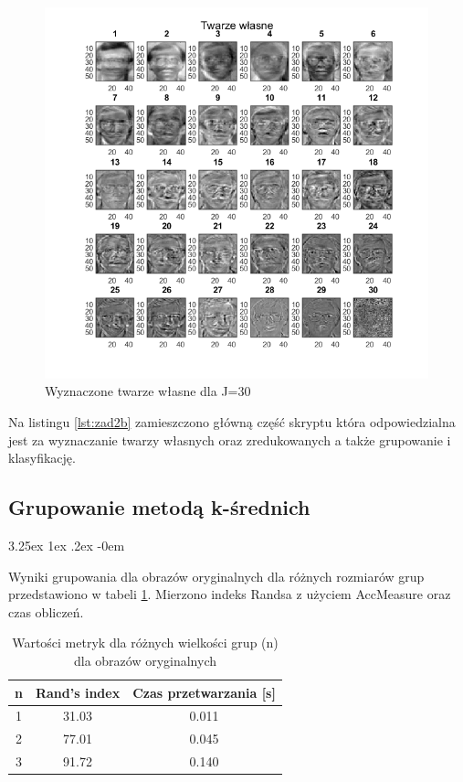 \documentclass[11pt, a4paper]{article}
\makeatletter
\renewcommand\paragraph{\@startsection{paragraph}{5}{\z@}
  {3.25ex \@plus1ex \@minus.2ex}
  {-0em}
  {\normalfont\normalsize\bfseries}}
\makeatother
\begin{document}
\begin{figure}[H]
	\centering
	\includegraphics[width=0.99\textwidth]{./assets/ilustracja_zad2_eigen_j30.png}
	\caption{Wyznaczone twarze własne dla J=30}
	\label{fig:ilustracja_zad2_eigen_j30}
\end{figure}

Na listingu \ref{lst:zad2b} zamieszczono główną część skryptu która odpowiedzialna jest za wyznaczanie twarzy własnych oraz zredukowanych a także grupowanie i klasyfikację.



\newpage
\subsection{Grupowanie metodą k-średnich}
\paragraph{}

Wyniki grupowania dla obrazów oryginalnych dla różnych rozmiarów grup przedstawiono w tabeli \ref{tab:wynikiGrupowaniaZwykle}. Mierzono indeks Randsa z użyciem AccMeasure oraz czas obliczeń.

\begin{table}[H]
	\centering
	\caption{Wartości metryk dla różnych wielkości grup (n) dla obrazów oryginalnych}
	\begin{tabular}{|c|c|c|}
		\hline 
		n & Rand's index & Czas przetwarzania [s] \\ 
		\hline
		1 & 31.03 & 0.011 \\
		\hline
		2 & 77.01 & 0.045 \\
		\hline
		3 & 91.72 & 0.140 \\
		\hline
	\end{tabular}
	\label{tab:wynikiGrupowaniaZwykle}
\end{table}
\end{document}

